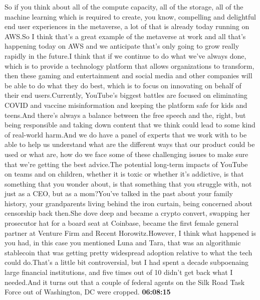 \documentclass{article}%
\begin{document}
So if you think about all of the compute capacity, all of the storage, all of the machine learning which is required to create, you know, compelling and delightful end user experiences in the metaverse, a lot of that is already today running on AWS.So I think that's a great example of the metaverse at work and all that's happening today on AWS and we anticipate that's only going to grow really rapidly in the future.I think that if we continue to do what we've always done, which is to provide a technology platform that allows organizations to transform, then these gaming and entertainment and social media and other companies will be able to do what they do best, which is to focus on innovating on behalf of their end users.Currently, YouTube's biggest battles are focused on eliminating COVID and vaccine misinformation and keeping the platform safe for kids and teens.And there's always a balance between the free speech and the, right, but being responsible and taking down content that we think could lead to some kind of real{-}world harm.And we do have a panel of experts that we work with to be able to help us understand what are the different ways that our product could be used or what are, how do we face some of these challenging issues to make sure that we're getting the best advice.The potential long{-}term impacts of YouTube on teams and on children, whether it is toxic or whether it's addictive, is that something that you wonder about, is that something that you struggle with, not just as a CEO, but as a mom?You've talked in the past about your family history, your grandparents living behind the iron curtain, being concerned about censorship back then.She dove deep and became a crypto convert, swapping her prosecutor hat for a board seat at Coinbase, became the first female general partner at Venture Firm and Recent Horowitz.However, I think what happened is you had, in this case you mentioned Luna and Tara, that was an algorithmic stablecoin that was getting pretty widespread adoption relative to what the tech could do.That's a little bit controversial, but I had spent a decade subpoenaing large financial institutions, and five times out of 10 didn't get back what I needed.And it turns out that a couple of federal agents on the Silk Road Task Force out of Washington, DC were cropped.%
\textbf{06:08:15}%
\newline%
\end{document}
